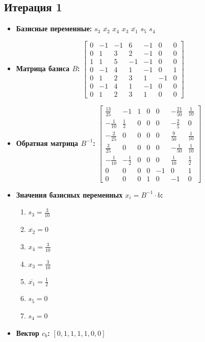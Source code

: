 \begin{itemize}
\subsection*{Итерация 1}
\begin{itemize}
\item \textbf{Базисные переменные:}
$s_3$
$\overline{x_2}$
$x_4$
$x_3$
$\overline{x_1}$
$s_5$
$s_4$
\item \textbf{Матрица базиса $B$:}
$\left[\begin{matrix}0 & -1 & -1 & 6 & -1 & 0 & 0\\0 & 1 & 3 & 2 & -1 & 0 & 0\\1 & 1 & 5 & -1 & -1 & 0 & 0\\0 & -1 & 4 & 1 & -1 & 0 & 1\\0 & 1 & 2 & 3 & 1 & -1 & 0\\0 & -1 & 4 & 1 & -1 & 0 & 0\\0 & 1 & 2 & 3 & 1 & 0 & 0\end{matrix}\right]$
\item \textbf{Обратная матрица $B^{-1}$:}
$\left[\begin{matrix}\frac{13}{25} & -1 & 1 & 0 & 0 & - \frac{21}{50} & \frac{1}{10}\\- \frac{1}{10} & \frac{1}{2} & 0 & 0 & 0 & - \frac{2}{5} & 0\\- \frac{2}{25} & 0 & 0 & 0 & 0 & \frac{9}{50} & \frac{1}{10}\\\frac{3}{25} & 0 & 0 & 0 & 0 & - \frac{1}{50} & \frac{1}{10}\\- \frac{1}{10} & - \frac{1}{2} & 0 & 0 & 0 & \frac{1}{10} & \frac{1}{2}\\0 & 0 & 0 & 0 & -1 & 0 & 1\\0 & 0 & 0 & 1 & 0 & -1 & 0\end{matrix}\right]$
\item \textbf{Значения базисных переменных $ x_i = B^{-1} \cdot b$:}
\begin{enumerate}
\item $s_3 = \frac{3}{10}$
\item $\overline{x_2} = 0$
\item $x_4 = \frac{3}{10}$
\item $x_3 = \frac{3}{10}$
\item $\overline{x_1} = \frac{1}{2}$
\item $s_5 = 0$
\item $s_4 = 0$
\end{enumerate}
\item \textbf{Вектор $c_b$:}
$[0, 1, 1, 1, 1, 0, 0]$

\end{itemize}
\end{itemize}
